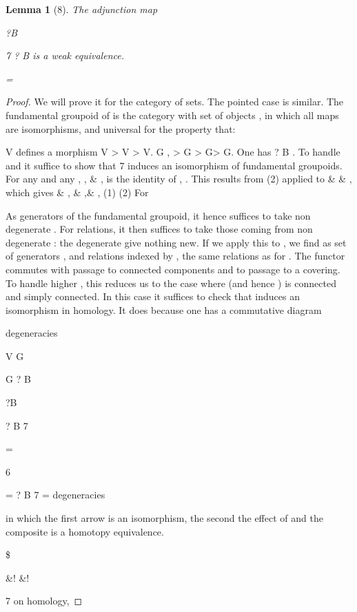 \documentclass[11pt,a4paper]{article}
\theoremstyle{plain}
\newtheorem{lemma}[theorem]{Lemma}
\theoremstyle{definition}
\begin{document}
\begin{lemma}[8]
The adjunction map

?B

7 ? B  is a weak equivalence.

=

\end{lemma}

\begin{proof} We will prove it for the category of sets. The pointed case is similar. The
fundamental groupoid of is the category with set of objects , in which all maps
are isomorphisms, and universal for the property that:





V  defines a morphism V > V > V.
G   , > G > G> G.
One has 
? B . To handle  and  it suffice to show that 7 induces
an isomorphism of fundamental groupoids. For any  and any ,   , \& , is
the identity of , . This results from (2) applied to \& \& , which gives
\& , \& ,\& ,
(1) 
(2) For

As generators of the fundamental groupoid, it hence suffices to take non degenerate
  . For relations, it then suffices to take those coming from non degenerate
 : the degenerate give nothing new.
If we apply this to
, we find as set of generators  , and relations indexed
by , the same relations as for .
The functor
commutes with passage to connected components and to passage
to a covering. To handle higher  , this reduces us to the case where (and hence
) is connected and simply connected. In this case it suffices to check that
induces an isomorphism in homology. It does because one has a commutative
diagram

degeneracies

V 
G 


G
? B

?B

? B
7

= 






6



= ? B
7
= degeneracies

in which the first arrow is an isomorphism, the second the effect of
and the composite is a homotopy equivalence.



   \$

\&! 
\&! 

7 on homology,


\end{proof}
\end{document}
